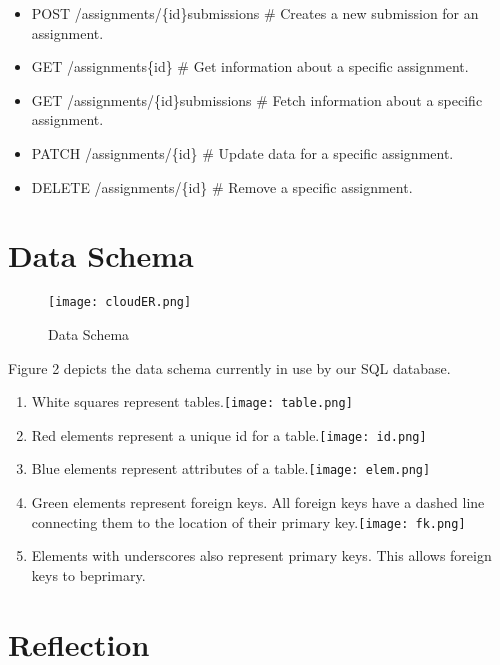 \documentclass[a4paper]{article}
\newcommand\tab[1][1cm]{\hspace*{#1}}
\begin{document}
{\begin{enumerate}
\begin{itemize}
      \item POST /assignments/\{id\}submissions \# Creates a new submission for an assignment.\\[1mm]
      \item GET /assignments\{id\} \# Get information about a specific assignment.\\[1mm]
      \item GET /assignments/\{id\}submissions \# Fetch information about a specific assignment.\\[1mm]
      \item PATCH /assignments/\{id\} \# Update data for a specific assignment.\\[1mm]
      \item DELETE /assignments/\{id\} \# Remove a specific assignment.
  \end{itemize}
\end{enumerate}}
\newpage
\section{Data Schema}
\begin{figure}[h!]
    \centering
    \texttt{[image: cloudER.png]}
    \caption{Data Schema}
    \label{fig:my_label}
\end{figure}
Figure 2 depicts the data schema currently in use by our SQL database.
\begin{enumerate}
    \item White squares represent tables.\tab\texttt{[image: table.png]}
    \item Red elements represent a unique id for a table.\tab\texttt{[image: id.png]}
    \item Blue elements represent attributes of a table.\tab\texttt{[image: elem.png]}
    \item Green elements represent foreign keys. All foreign keys have a dashed line connecting them to the location of their primary key.\tab\texttt{[image: fk.png]}
    \item Elements with underscores also represent primary keys. This allows foreign keys to be\newline primary.
\end{enumerate}
\section{Reflection}
\end{document}
